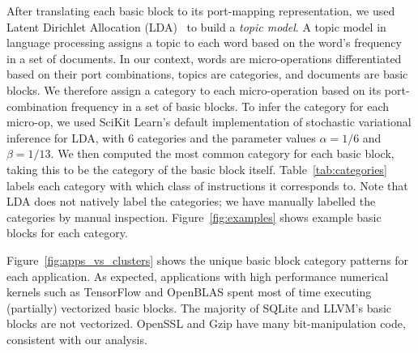 After translating each basic block to its port-mapping representation, we used Latent Dirichlet Allocation (LDA)~\cite{lda} to build a \emph{topic model}. A topic model in language processing assigns a topic to each word based on the word's frequency in a set of documents. In our context, words are micro-operations differentiated based on their port combinations, topics are categories, and documents are basic blocks. We therefore assign a category to each micro-operation based on its port-combination frequency in a set of basic blocks.
To infer the category for each micro-op, we
used SciKit Learn's default implementation of stochastic variational inference for LDA\cite{lda},
with 6 categories and the parameter values $\alpha = 1/6$ and $\beta = 1/13$. 
We then computed the most common category for each basic block, taking this to be the category of the basic block itself.
Table~\ref{tab:categories} labels each category with which class of instructions it corresponds to.
Note that LDA does not natively label the categories;
we have manually labelled the categories by manual inspection.
Figure~\ref{fig:examples} shows example basic blocks for each category.

Figure~\ref{fig:apps_vs_clusters} shows the unique basic block category patterns for each application.
As expected, applications with high performance numerical kernels such as TensorFlow and
OpenBLAS spent most of time executing (partially) vectorized basic blocks.
The majority of SQLite and LLVM's basic blocks are not vectorized.
OpenSSL and Gzip have many bit-manipulation code, consistent with our analysis.

